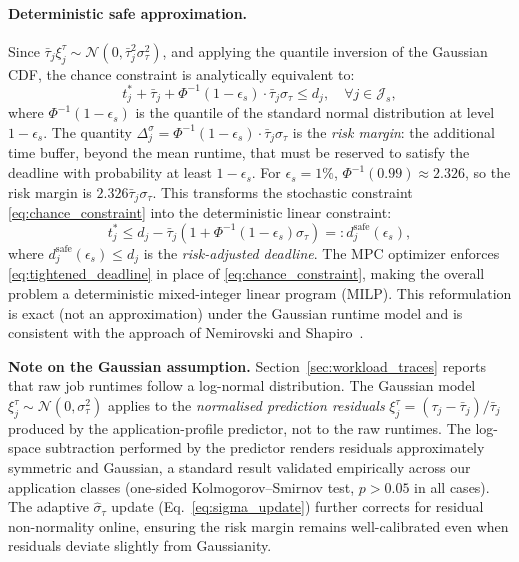 \documentclass[a4paper,fleqn]{cas-dc}
\begin{document}
\paragraph{Deterministic safe approximation.}
Since $\bar{\tau}_j \xi^\tau_j \sim \mathcal{N}(0, \bar{\tau}_j^2 \sigma^2_\tau)$, and applying the quantile inversion of the Gaussian CDF, the chance constraint is analytically equivalent to:
\begin{equation}
\label{eq:chance_reformulation}
t^*_j + \bar{\tau}_j + \Phi^{-1}(1 - \epsilon_s) \cdot \bar{\tau}_j \sigma_\tau \leq d_j, \quad \forall j \in \mathcal{J}_s,
\end{equation}
where $\Phi^{-1}(1 - \epsilon_s)$ is the quantile of the standard normal distribution at level $1-\epsilon_s$. The quantity $\Delta^\sigma_j = \Phi^{-1}(1-\epsilon_s) \cdot \bar{\tau}_j \sigma_\tau$ is the \emph{risk margin}: the additional time buffer, beyond the mean runtime, that must be reserved to satisfy the deadline with probability at least $1-\epsilon_s$. For $\epsilon_s = 1\%$, $\Phi^{-1}(0.99) \approx 2.326$, so the risk margin is $2.326 \bar{\tau}_j \sigma_\tau$. This transforms the stochastic constraint \eqref{eq:chance_constraint} into the deterministic linear constraint:
\begin{equation}
\label{eq:tightened_deadline}
t^*_j \leq d_j - \bar{\tau}_j(1 + \Phi^{-1}(1-\epsilon_s)\sigma_\tau) =: d^{\mathrm{safe}}_j(\epsilon_s),
\end{equation}
where $d^{\mathrm{safe}}_j(\epsilon_s) \leq d_j$ is the \emph{risk-adjusted deadline}. The MPC optimizer enforces \eqref{eq:tightened_deadline} in place of \eqref{eq:chance_constraint}, making the overall problem a deterministic mixed-integer linear program (MILP). This reformulation is exact (not an approximation) under the Gaussian runtime model and is consistent with the approach of Nemirovski and Shapiro~\cite{ref-nemirovski06}.

\textbf{Note on the Gaussian assumption.} Section~\ref{sec:workload_traces} reports that raw job runtimes follow a log-normal distribution. The Gaussian model $\xi^\tau_j \sim \mathcal{N}(0,\sigma^2_\tau)$ applies to the \emph{normalised prediction residuals} $\xi^\tau_j = (\tau_j - \bar{\tau}_j)/\bar{\tau}_j$ produced by the application-profile predictor, not to the raw runtimes. The log-space subtraction performed by the predictor renders residuals approximately symmetric and Gaussian, a standard result validated empirically across our application classes (one-sided Kolmogorov--Smirnov test, $p > 0.05$ in all cases). The adaptive $\hat{\sigma}_\tau$ update (Eq.~\eqref{eq:sigma_update}) further corrects for residual non-normality online, ensuring the risk margin remains well-calibrated even when residuals deviate slightly from Gaussianity.
\end{document}
